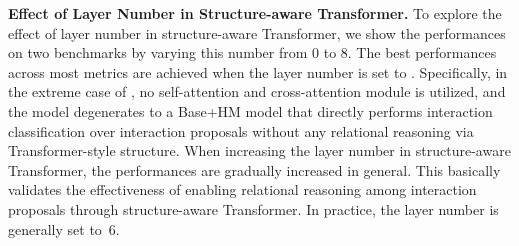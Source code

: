 \documentclass[10pt,twocolumn,letterpaper]{article}
\begin{document}
\begin{table}[!tb]
\begin{center}
\vspace{-0.22in}
\end{center}
\vspace{-0.2in}
\caption{Performance comparison with different layer numbers of the structure-aware Transformer in our STIP.}
\label{tab:Transformer-layer-ablation}
\vspace{-0.25in}
\end{table}


\textbf{Effect of Layer Number  in Structure-aware Transformer.}
To explore the effect of layer number  in structure-aware Transformer, we show the performances on two benchmarks by varying this number from 0 to 8. The best performances across most metrics are achieved when the layer number is set to . Specifically, in the extreme case of , no self-attention and cross-attention module is utilized, and the model degenerates to a Base+HM model that directly performs interaction classification over interaction proposals without any relational reasoning via Transformer-style structure. When increasing the layer number in structure-aware Transformer, the performances are gradually increased in general. This basically validates the effectiveness of enabling relational reasoning among interaction proposals through structure-aware Transformer. In practice, the layer number  is generally set to~6.
\end{document}
